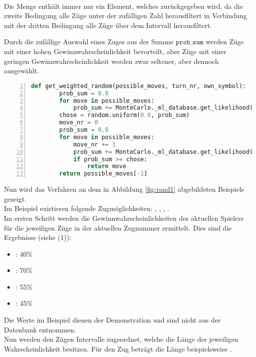 \begin{itemize}
\vspace{0.25cm}\\Die Menge enthält immer nur ein Element, welches zurückgegeben wird, da die zweite Bedingung alle Züge unter der zufälligen Zahl herausfiltert in Verbindung mit der dritten Bedingung alle Züge über dem Intervall herausfiltert.
\end{itemize}
Durch die zufällige Auswahl eines Zuges aus der Summe $\mathtt{prob\_sum}$ werden Züge mit einer hohen Gewinnwahrscheinlichkeit bevorteilt, aber Züge mit einer geringen Gewinnwahrscheinlichkeit werden zwar seltener, aber dennoch ausgewählt.

\begin{lstlisting}[basicstyle=\footnotesize, caption = {get\_weighted\_random Funktion des Monte-Carlo Agenten}, language = python, captionpos = t , numbers=left, label={lst:wmc1}]
    def get_weighted_random(possible_moves, turn_nr, own_symbol):
        prob_sum = 0.0
        for move in possible_moves:
            prob_sum += MonteCarlo._ml_database.get_likelihood(move,turn_nr,own_symbol)
        chose = random.uniform(0.0, prob_sum)
        move_nr = 0
        prob_sum = 0.0
        for move in possible_moves:
            move_nr += 1
            prob_sum += MonteCarlo._ml_database.get_likelihood(move,turn_nr,own_symbol)
            if prob_sum >= chose:
                return move
        return possible_moves[-1]
\end{lstlisting}
Nun wird das Verfahren an dem in Abbildung \ref{fig:rand1} abgebildeten Beispiels gezeigt.
\\
Im Beispiel existieren folgende Zugmöglichkeiten: , , , .
\\Im ersten Schritt werden die Gewinnwahrscheinlichkeiten des aktuellen Spielers für die jeweiligen Züge in der aktuellen Zugnummer ermittelt. Dies sind die Ergebnisse (siehe (1)):
\begin{itemize}
\item {}: 40\%
\item {}: 70\%
\item {}: 55\%
\item {}: 45\%
\end{itemize}
Die Werte im Beispiel dienen der Demonstration und sind nicht aus der Datenbank entnommen.
\\Nun werden den Zügen Intervalle zugeordnet, welche die Länge der jeweiligen Wahrscheinlichkeit besitzen. Für den Zug  beträgt die Länge beispielsweise . 
